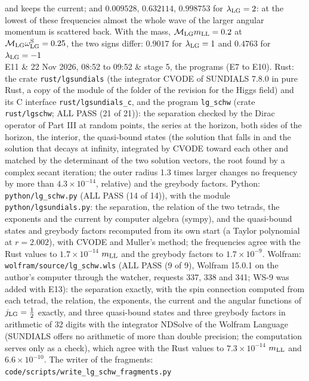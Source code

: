 \documentclass[
  10pt,
]{article}
\begin{document}
\begin{longtable}[]
and keeps the current; and \(0.009528\), \(0.632114\), \(0.998753\) for
\(\lambda_{\rm LG}=2\): at the lowest of these frequencies almost the
whole wave of the larger angular momentum is scattered back. With the
mass, \(\mathcal M_{\rm LG}m_{\rm LL}=0.2\) at
\(\mathcal M_{\rm LG}\omega^{\rm S}_{\rm LG}=0.25\), the two signs
differ: \(0.9017\) for \(\lambda_{\rm LG}=1\) and \(0.4763\) for
\(\lambda_{\rm LG}=-1\) \\
E11 & 22 Nov 2026, 08:52 to 09:52 & stage 5, the programs (E7 to E10).
Rust: the crate \texttt{rust/lgsundials} (the integrator CVODE of
SUNDIALS 7.8.0 in pure Rust, a copy of the module of the folder of the
revision for the Higgs field) and its C interface
\texttt{rust/lgsundials\_c}, and the program \texttt{lg\_schw} (crate
\texttt{rust/lgschw}; ALL PASS (21 of 21)): the separation checked by
the Dirac operator of Part III at random points, the series at the
horizon, both sides of the horizon, the interior, the quasi-bound states
(the solution that falls in and the solution that decays at infinity,
integrated by CVODE toward each other and matched by the determinant of
the two solution vectors, the root found by a complex secant iteration;
the outer radius 1.3 times larger changes no frequency by more than
\(4.3\times10^{-14}\), relative) and the greybody factors. Python:
\texttt{python/lg\_schw.py} (ALL PASS (14 of 14)), with the module
\texttt{python/lgsundials.py}: the separation, the relation of the two
tetrads, the exponents and the current by computer algebra (sympy), and
the quasi-bound states and greybody factors recomputed from its own
start (a Taylor polynomial at \(r=2.002\)), with CVODE and Muller's
method; the frequencies agree with the Rust values to
\(1.7\times10^{-14}\) \(m_{\rm LL}\) and the greybody factors to
\(1.7\times10^{-9}\). Wolfram: \texttt{wolfram/source/lg\_schw.wls} (ALL
PASS (9 of 9), Wolfram 15.0.1 on the author's computer through the
watcher, requests 337, 338 and 341; WS-9 was added with E13): the
separation exactly, with the spin connection computed from each tetrad,
the relation, the exponents, the current and the angular functions of
\(j_{\rm LG}=\tfrac12\) exactly, and three quasi-bound states and three
greybody factors in arithmetic of 32 digits with the integrator NDSolve
of the Wolfram Language (SUNDIALS offers no arithmetic of more than
double precision; the computation serves only as a check), which agree
with the Rust values to \(7.3\times10^{-14}\) \(m_{\rm LL}\) and
\(6.6\times10^{-10}\). The writer of the fragments:
\texttt{code/scripts/write\_lg\_schw\_fragments.py} \\

\end{longtable}
\end{document}
